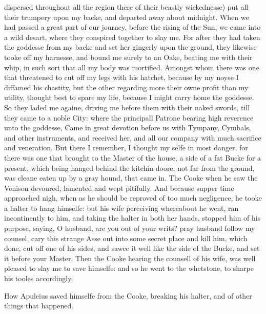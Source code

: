 dispersed throughout all the region there of their beastly wickednesse) put all
their trumpery upon my backe, and departed away about midnight. When we had
passed a great part of our journey, before the rising of the Sun, we came into
a wild desart, where they conspired together to slay me. For after they had
taken the goddesse from my backe and set her gingerly upon the ground, they
likewise tooke off my harnesse, and bound me surely to an Oake, beating me with
their whip, in such sort that all my body was mortified. Amongst whom there was
one that threatened to cut off my legs with his hatchet, because by my noyse I
diffamed his chastity, but the other regarding more their owne profit than my
utility, thought best to spare my life, because I might carry home the
goddesse. So they laded me againe, driving me before them with their naked
swords, till they came to a noble City: where the principall Patrone bearing
high reverence unto the goddesse, Came in great devotion before us with
Tympany, Cymbals, and other instruments, and received her, and all our company
with much sacrifice and veneration. But there I remember, I thought my selfe in
most danger, for there was one that brought to the Master of the house, a side
of a fat Bucke for a present, which being hanged behind the kitchin doore, not
far from the ground, was cleane eaten up by a gray hound, that came in. The
Cooke when he saw the Venison devoured, lamented and wept pitifully. And
because supper time approached nigh, when as he should be reproved of too much
negligence, he tooke a halter to hang himselfe: but his wife perceiving
whereabout he went, ran incontinently to him, and taking the halter in both her
hands, stopped him of his purpose, saying, O husband, are you out of your
writs? pray husband follow my counsel, cary this strange Asse out into some
secret place and kill him, which done, cut off one of his sides, and sawce it
well like the side of the Bucke, and set it before your Master. Then the Cooke
hearing the counsell of his wife, was well pleased to slay me to save himselfe:
and so he went to the whetstone, to sharpe his tooles accordingly.



How Apuleius saved himselfe from the Cooke, breaking his halter, and of other
things that happened.

